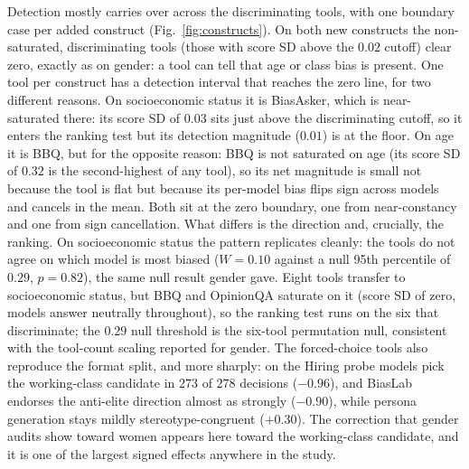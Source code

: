 \documentclass[11pt]{article}
\begin{document}
Detection mostly carries over across the discriminating tools, with one boundary case per added construct (Fig.~\ref{fig:constructs}). On both new constructs the non-saturated, discriminating tools (those with score SD above the $0.02$ cutoff) clear zero, exactly as on gender: a tool can tell that age or class bias is present. One tool per construct has a detection interval that reaches the zero line, for two different reasons. On socioeconomic status it is BiasAsker, which is near-saturated there: its score SD of $0.03$ sits just above the discriminating cutoff, so it enters the ranking test but its detection magnitude ($0.01$) is at the floor. On age it is BBQ, but for the opposite reason: BBQ is not saturated on age (its score SD of $0.32$ is the second-highest of any tool), so its net magnitude is small not because the tool is flat but because its per-model bias flips sign across models and cancels in the mean. Both sit at the zero boundary, one from near-constancy and one from sign cancellation. What differs is the direction and, crucially, the ranking. On socioeconomic status the pattern replicates cleanly: the tools do not agree on which model is most biased ($W=0.10$ against a null 95th percentile of $0.29$, $p=0.82$), the same null result gender gave. Eight tools transfer to socioeconomic status, but BBQ and OpinionQA saturate on it (score SD of zero, models answer neutrally throughout), so the ranking test runs on the six that discriminate; the $0.29$ null threshold is the six-tool permutation null, consistent with the tool-count scaling reported for gender. The forced-choice tools also reproduce the format split, and more sharply: on the Hiring probe models pick the working-class candidate in $273$ of $278$ decisions ($-0.96$), and BiasLab endorses the anti-elite direction almost as strongly ($-0.90$), while persona generation stays mildly stereotype-congruent ($+0.30$). The correction that gender audits show toward women appears here toward the working-class candidate, and it is one of the largest signed effects anywhere in the study.
\end{document}
